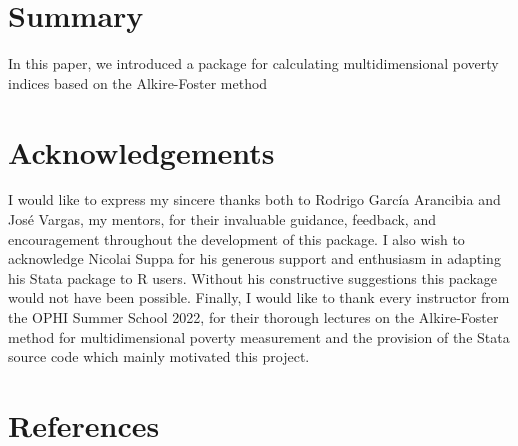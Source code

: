 \hypertarget{summary}{%
\section{Summary}\label{summary}}

In this paper, we introduced a package for calculating multidimensional poverty indices based on the Alkire-Foster method

\hypertarget{acknowledgements}{%
\section{Acknowledgements}\label{acknowledgements}}

I would like to express my sincere thanks both to Rodrigo García Arancibia and José Vargas, my mentors, for their invaluable guidance, feedback, and encouragement throughout the development of this package. I also wish to acknowledge Nicolai Suppa for his generous support and enthusiasm in adapting his Stata package to R users. Without his constructive suggestions this package would not have been possible. Finally, I would like to thank every instructor from the OPHI Summer School 2022, for their thorough lectures on the Alkire-Foster method for multidimensional poverty measurement and the provision of the Stata source code which mainly motivated this project.

\hypertarget{references}{%
\section*{References}\label{references}}

